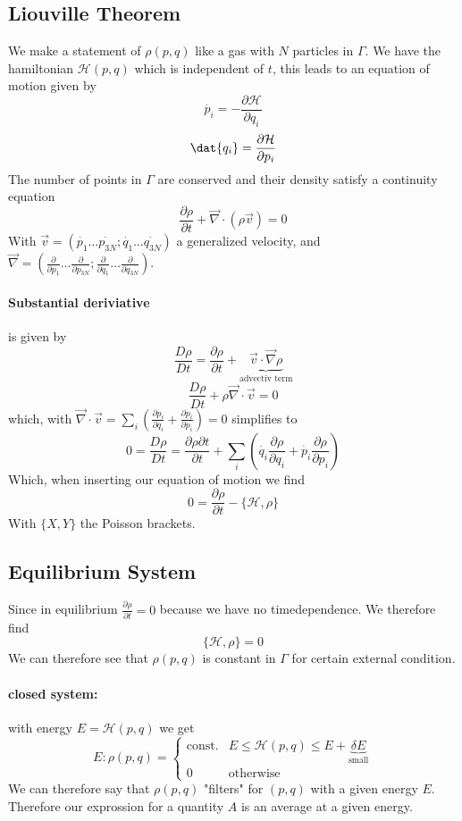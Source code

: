 \documentclass{report}
\begin{document}
\subsection{Liouville Theorem}
We make a statement of $\rho\left( p,q \right) $ like a gas with $N$ particles in $\Gamma$. We have the hamiltonian $\mathcal{H}\left( p,q \right) $ which is independent of $t$, this leads to an equation of motion given by \[
  \dot{p_i} = - \frac{\partial \mathcal{H} }{\partial q_i }
\] \[
\dat{q_i} = \frac{\partial \mathcal{H} }{\partial p_i }
\] 
The number of points in $\Gamma$ are conserved and their density satisfy a continuity equation \[
  \frac{\partial \rho }{\partial t } + \vec{\nabla} \cdot \left( \rho \vec{v} \right) = 0
\] With $\vec{v} = \left( \dot{p_1} \ldots \dot{p_{3N}} ; \dot{q_1} \ldots \dot{q_{3N}} \right) $ a generalized velocity, and $\vec{\nabla} = \left( \frac{\partial }{\partial p_1 } \ldots \frac{\partial }{\partial p_{3N}} ; \frac{\partial }{\partial q_1 } \ldots \frac{\partial }{\partial q_{3N} } \right) $.\\
\paragraph{Substantial deriviative} is given by \[
  \frac{D\rho}{Dt} = \frac{\partial \rho }{\partial t } + \underbrace{\vec{v}\cdot \vec{\nabla} \rho}_{\text{advectiv term}}
\] \[
\frac{D\rho}{Dt} + \rho \vec{\nabla} \cdot \vec{v} = 0
\] which, with $\vec{\nabla} \cdot \vec{v} = \sum_{i} \left( \frac{\partial \dot{p_i }}{\partial q_i }+ \frac{\partial \dot{p_i} }{\partial p_i } \right) = 0  $ simplifies to \[
0 = \frac{D \rho}{Dt} = \frac{\partial \rho \partial t }{\partial t } + \sum_{i} \left( \dot{q_i} \frac{\partial \rho }{\partial q_i } + \dot{p_i} \frac{\partial \rho }{\partial p_i } \right) 
\] Which, when inserting our equation of motion we find \[
0 = \frac{\partial \rho }{\partial t } - \{ \mathcal{H}, \rho\}
\] 
With $\{ X, Y \}$ the Poisson brackets. 
\subsection{Equilibrium System}
Since in equilibrium $\frac{\partial \rho }{\partial t } = 0$ because we have no timedependence. We therefore find \[
\{ \mathcal{H} , \rho\} = 0
\] 
We can therefore see that $\rho\left( p,q \right) $ is constant in $\Gamma$ for certain external condition.
\paragraph{closed system:} with energy $E = \mathcal{H}\left( p, q \right) $ we get \[
  E: \rho\left( p,q \right) = \begin{cases}
    \text{const.} & E\le  \mathcal{H}\left( p,q \right) \le E + \underbrace{\delta E}_{\text{small}} \\
    0 & \text{otherwise}
  \end{cases}
\] 
We can therefore say that $\rho\left( p,q \right) $ "filters" for $\left( p,q \right) $ with a given energy $E$.
Therefore our exprossion for a quantity $A$ is an average at a given energy.
\end{document}
